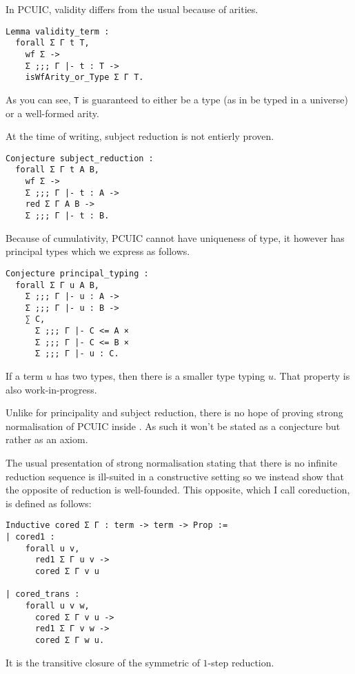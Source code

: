 
In \acrshort{PCUIC}, validity differs from the usual because of arities.
\begin{verbatim}
Lemma validity_term :
  forall Σ Γ t T,
    wf Σ ->
    Σ ;;; Γ |- t : T ->
    isWfArity_or_Type Σ Γ T.
\end{verbatim}
As you can see, \texttt{T} is guaranteed to either be a type (as in
be typed in a universe) or a well-formed arity.


At the time of writing, subject reduction is not entierly proven.
\begin{verbatim}
Conjecture subject_reduction :
  forall Σ Γ t A B,
    wf Σ ->
    Σ ;;; Γ |- t : A ->
    red Σ Γ A B ->
    Σ ;;; Γ |- t : B.
\end{verbatim}


Because of cumulativity, \acrshort{PCUIC} cannot have uniqueness of type, it
however has principal types which we express as follows.
\begin{verbatim}
Conjecture principal_typing :
  forall Σ Γ u A B,
    Σ ;;; Γ |- u : A ->
    Σ ;;; Γ |- u : B ->
    ∑ C,
      Σ ;;; Γ |- C <= A ×
      Σ ;;; Γ |- C <= B ×
      Σ ;;; Γ |- u : C.
\end{verbatim}
If a term \(u\) has two types, then there is a smaller type typing \(u\).
That property is also work-in-progress.


Unlike for principality and subject reduction, there is no hope of proving
strong normalisation of \acrshort{PCUIC} inside \Coq. As such it won't be stated
as a conjecture but rather as an axiom.

The usual presentation of strong normalisation stating that there is no infinite
reduction sequence is ill-suited in a constructive setting so we instead show
that the opposite of reduction is well-founded.
This opposite, which I call coreduction, is defined as follows:
\begin{verbatim}
Inductive cored Σ Γ : term -> term -> Prop :=
| cored1 :
    forall u v,
      red1 Σ Γ u v ->
      cored Σ Γ v u

| cored_trans :
    forall u v w,
      cored Σ Γ v u ->
      red1 Σ Γ v w ->
      cored Σ Γ w u.
\end{verbatim}
It is the transitive closure of the symmetric of \(1\)-step reduction.

